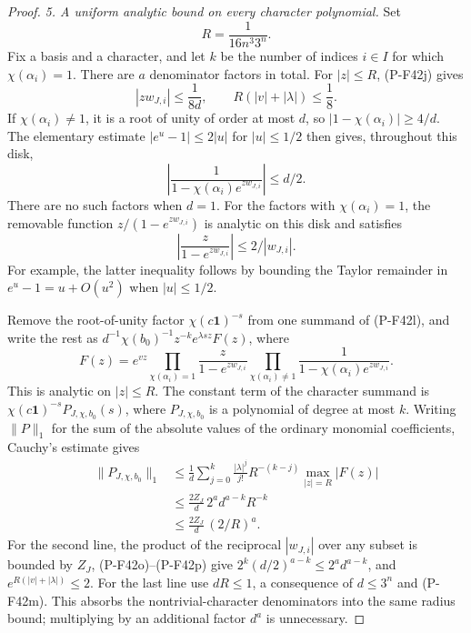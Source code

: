 \documentclass[11pt,a4paper]{article}
\begin{document}
\begin{proof}
\emph{5. A uniform analytic bound on every character polynomial.}
Set
\[
                      R=\frac1{16n^3 3^n}.
 \tag{P-F42m}
\]
Fix a basis and a character, and let $k$ be the number of
indices $i\in I$ for which $\chi(\alpha_i)=1$.
There are $a$ denominator factors in total.
For $|z|\le R$, (P-F42j) gives
\[
 |zw_{J,i}|\le\frac1{8d},\qquad
 R(|v|+|\lambda|)\le\frac18.
 \tag{P-F42n}
\]
If $\chi(\alpha_i)\ne1$, it is a root of unity of order at
most $d$, so
$|1-\chi(\alpha_i)|\ge4/d$.
The elementary estimate $|e^u-1|\le2|u|$ for $|u|\le1/2$
then gives, throughout this disk,
\[
 \left|\frac1{1-\chi(\alpha_i)e^{z w_{J,i}}}\right|
          \le d/2.
 \tag{P-F42o}
\]
There are no such factors when $d=1$.
For the factors with $\chi(\alpha_i)=1$, the removable
function $z/(1-e^{z w_{J,i}})$ is analytic on this disk and
satisfies
\[
 \left|\frac{z}{1-e^{z w_{J,i}}}\right|
            \le2/|w_{J,i}|.
 \tag{P-F42p}
\]
For example, the latter inequality follows by bounding the
Taylor remainder in $e^u-1=u+O(u^2)$ when $|u|\le1/2$.

Remove the root-of-unity factor $\chi(c\mathbf1)^{-s}$ from
one summand of (P-F42l), and write the rest as
$d^{-1}\chi(b_0)^{-1}z^{-k}e^{\lambda sz}F(z)$, where
\[
 F(z)=e^{vz}
 \prod_{\chi(\alpha_i)=1}
             \frac{z}{1-e^{z w_{J,i}}}
 \prod_{\chi(\alpha_i)\ne1}
             \frac1{1-\chi(\alpha_i)e^{z w_{J,i}}}.
\]
This is analytic on $|z|\le R$.
The constant term of the character summand is
$\chi(c\mathbf1)^{-s}P_{J,\chi,b_0}(s)$, where
$P_{J,\chi,b_0}$ is a polynomial of degree at most $k$.
Writing $\|P\|_1$ for the sum of the absolute values of
the ordinary monomial coefficients, Cauchy's estimate gives
\begin{align*}
 \|P_{J,\chi,b_0}\|_1
 &\le \frac1d
       \sum_{j=0}^k\frac{|\lambda|^j}{j!}
          R^{-(k-j)}\max_{|z|=R}|F(z)|\\
 &\le \frac{2Z_J}{d}\,2^a d^{a-k}R^{-k}\\
 &\le \frac{2Z_J}{d}\,(2/R)^a.
 \tag{P-F42q}
\end{align*}
For the second line, the product of the reciprocal
$|w_{J,i}|$ over any subset is bounded by $Z_J$,
(P-F42o)--(P-F42p) give
$2^k(d/2)^{a-k}\le2^a d^{a-k}$, and
$e^{R(|v|+|\lambda|)}\le2$.
For the last line use $dR\le1$, a consequence of
$d\le3^n$ and (P-F42m).
This absorbs the nontrivial-character denominators into
the same radius bound; multiplying by an additional
factor $d^a$ is unnecessary.


\end{proof}
\end{document}
